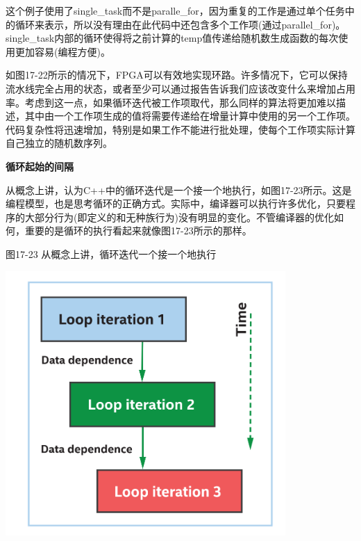 这个例子使用了single\_task而不是paralle\_for，因为重复的工作是通过单个任务中的循环来表示，所以没有理由在此代码中还包含多个工作项(通过parallel\_for)。single\_task内部的循环使得将之前计算的temp值传递给随机数生成函数的每次使用更加容易(编程方便)。\par

如图17-22所示的情况下，FPGA可以有效地实现环路。许多情况下，它可以保持流水线完全占用的状态，或者至少可以通过报告告诉我们应该改变什么来增加占用率。考虑到这一点，如果循环迭代被工作项取代，那么同样的算法将更加难以描述，其中由一个工作项生成的值将需要传递给在增量计算中使用的另一个工作项。代码复杂性将迅速增加，特别是如果工作不能进行批处理，使每个工作项实际计算自己独立的随机数序列。\par

\hspace*{\fill} \par %
\textbf{循环起始的间隔}

从概念上讲，认为C++中的循环迭代是一个接一个地执行，如图17-23所示。这是编程模型，也是思考循环的正确方式。实际中，编译器可以执行许多优化，只要程序的大部分行为(即定义的和无种族行为)没有明显的变化。不管编译器的优化如何，重要的是循环的执行看起来就像图17-23所示的那样。\par

\hspace*{\fill} \par %
图17-23 从概念上讲，循环迭代一个接一个地执行
\begin{center}
	\includegraphics[width=0.8\textwidth]{content/chapter-17/images/18}
\end{center}

